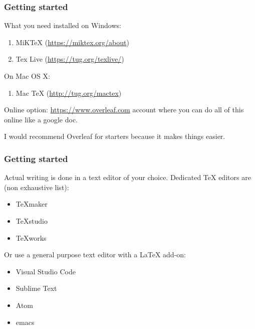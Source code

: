 \documentclass{beamer}
\begin{document}

\begin{frame}
\frametitle{Getting started}
What you need installed on Windows:
\begin{enumerate}
\item MiKTeX  (\url{https://miktex.org/about})
\item Tex Live (\url{https://tug.org/texlive/})
\end{enumerate}

On Mac OS X:
\begin{enumerate}
	\item Mac TeX (\url{http://tug.org/mactex})
\end{enumerate}

\bigskip
Online option: \url{https://www.overleaf.com} account where you can do all of this online like a google doc.

I would recommend Overleaf for starters because it makes things easier.
\end{frame}




\begin{frame}
\frametitle{Getting started}
Actual writing is done in a text editor of your choice. Dedicated TeX editors are (non exhaustive list):

\begin{itemize}
		\item TeXmaker
		\item TeXstudio
		\item TeXworks
\end{itemize}

Or use a general purpose text editor with a LaTeX add-on:

\begin{itemize}
	\item Visual Studio Code
	\item Sublime Text
	\item Atom
	\item emacs
\end{itemize}

\end{frame}
\end{document}
